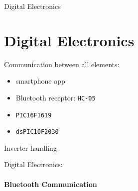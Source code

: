 \documentclass{beamer}
\begin{document}
	\begin{frame}{Digital Electronics}
		\section[Digital Elec]{Digital Electronics}
		Communication between all elements:
		\begin{itemize}
			\item smartphone app
	  		\item Bluetooth receptor: \texttt{HC-05}
			\item \texttt{PIC16F1619}
			\item \texttt{dsPIC10F2030}
	  	\end{itemize}
	  	Inverter handling
	\end{frame}
	\begin{frame}{Digital Electronics:}
		\framesubtitle{Bluetooth Communication}

\end{frame}
\end{document}

